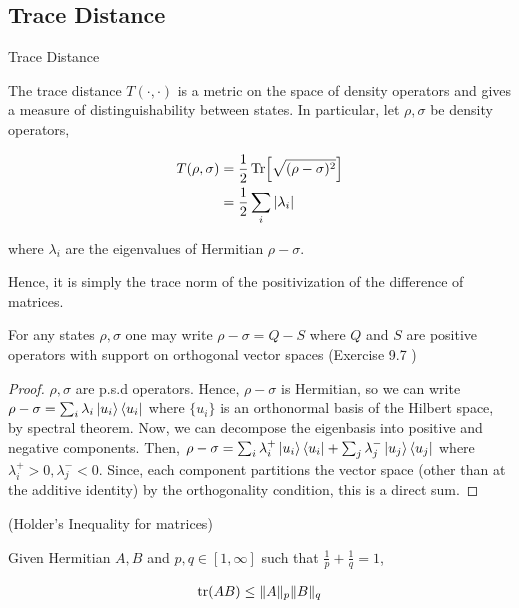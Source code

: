 \documentclass[main.tex]{subfiles}
\begin{document}
\subsection{Trace Distance}

\begin{definition}
Trace Distance

The trace distance $T(\cdot , \cdot)$ is a metric on the space of density operators and gives a measure of distinguishability between states. In particular, let $\rho, \sigma$ be density operators,

\begin{align*}
	T(\rho, \sigma) &= \frac{1}{2} \Tr [\sqrt{(\rho - \sigma)^2}] \\
	&= \frac{1}{2} \sum_i |\lambda_i|
\end{align*}

where $\lambda_i$ are the eigenvalues of Hermitian $\rho - \sigma$.

Hence, it is simply the trace norm of the positivization of the difference of matrices.

\end{definition}

\begin{lemma}
\label{lem:nc97}
For any states $\rho, \sigma$ one may write $\rho - \sigma = Q - S$ where $Q$ and $S$ are positive operators with support on orthogonal vector spaces	(Exercise 9.7 \cite{nielsen2010quantum})
\end{lemma}

\begin{proof}
$\rho, \sigma$ are p.s.d operators. Hence, $\rho - \sigma$ is Hermitian, so we can write $\rho - \sigma = \sum_i \lambda_i \ket{u_i}\bra{u_i}$ where $\{ u_i \}$ is an orthonormal basis of the Hilbert space, by spectral theorem. Now, we can decompose the eigenbasis into positive and negative components. Then, $\rho - \sigma = \sum_i \lambda^+_i \ket{u_i}\bra{u_i} + \sum_j \lambda^-_j\ket{u_j}\bra{u_j}$ where $\lambda^+_i >0, \lambda^-_j < 0$. Since, each component partitions the vector space (other than at the additive identity) by the orthogonality condition, this is a direct sum.
\end{proof}


\begin{lemma}
\label{lem:holder}
	(Holder's Inequality for matrices)

	Given Hermitian $A, B$ and $p,q \in [1, \infty]$ such that $\frac{1}{p}+\frac{1}{q} = 1$,

	\begin{align*}
	\tr(AB) \leq \|A\|_p\|B\|_q
	\end{align*}
\end{lemma}
\end{document}
